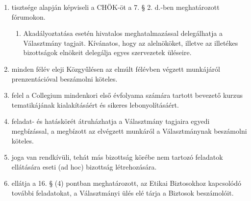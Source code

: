 \documentclass{../styles/rulebook}
\begin{document}
\begin{enumerate}
\begin{enumerate}
        \item tisztsége alapján képviseli a CHÖK-öt a 7. § 2. d.-ben meghatározott fórumokon.
		\begin{enumerate}
            \item Akadályoztatása esetén hivatalos meghatalmazással delegálhatja a Választmány tagjait. Kívánatos, hogy az alelnököket, illetve az illetékes bizottságok elnökeit delegálja egyes szervezetek üléseire.
		\end{enumerate}
		\item minden félév eleji Közgyűlésen az elmúlt félévben végzett munkájáról prenzentációval beszámolni köteles.
        \item felel a Collegium mindenkori első évfolyama számára tartott bevezető kurzus tematikájának kialakításáért és sikeres lebonyolításáért.
        \item feladat- és hatáskörét átruházhatja a Választmány tagjaira egyedi megbízással, a megbízott az elvégzett munkáról a Választmánynak beszámolni köteles.
        \item joga van rendkívüli, tehát más bizottság körébe nem tartozó feladatok ellátására eseti (ad hoc) bizottság létrehozására.
        \item ellátja a 16. § (4) pontban meghatározott, az Etikai Biztosokhoz kapcsolódó további feladatokat, a Választmányi ülés elé tárja a Biztosok beszámolóit.
	\end{enumerate}


\end{enumerate}
\end{document}
